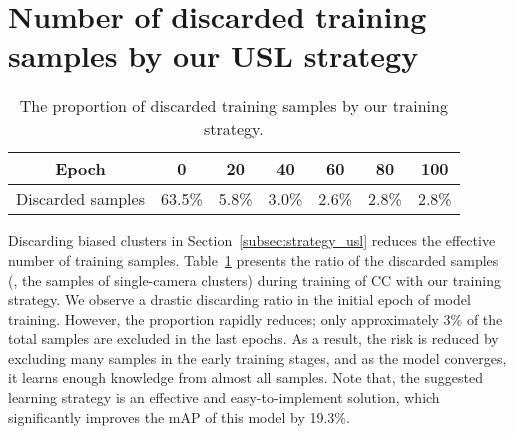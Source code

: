 \section{Number of discarded training samples by our USL strategy}
\label{sup:usl_discarded_ratio}


\begin{table}[H]
    \caption{
        The proportion of discarded training samples by our training strategy.
    }
    \label{tab:discarded_ratio}
    \centering
{
    \renewcommand{\arraystretch}{1.1}
    \begin{tabular}{c|cccccc}
        \hline
        Epoch & 0  & 20 & 40 & 60 & 80 & 100 \\
        \hline  \hline
        
        Discarded samples & 63.5\% & 5.8\% & 3.0\% & 2.6\% & 2.8\% & 2.8\% \\
        \hline
    \end{tabular}
}
\end{table}

Discarding biased clusters in Section~\ref{subsec:strategy_usl} reduces the effective number of training samples.
Table~\ref{tab:discarded_ratio} presents the ratio of the discarded samples (\ie, the samples of single-camera clusters) during training of CC with our training strategy. 
We observe a drastic discarding ratio in the initial epoch of model training. 
However, the proportion rapidly reduces; only approximately 3\% of the total samples are excluded in the last epochs. 
As a result, the risk is reduced by excluding many samples in the early training stages, and as the model converges, it learns enough knowledge from almost all samples. Note that, the suggested learning strategy is an effective and easy-to-implement solution, which significantly improves the mAP of this model by 19.3\%.







